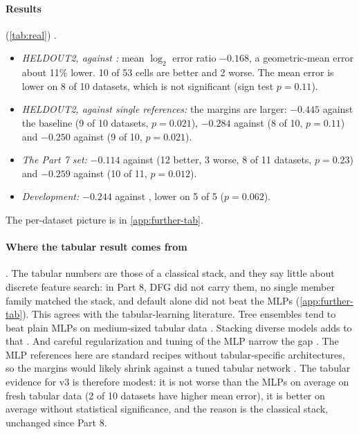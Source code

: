 \paragraph{Results} (\cref{tab:real}) .
\begin{itemize}
\item \emph{HELDOUT2, against :} mean $\log_2$ error ratio $-0.168$, a geometric-mean error about 11\% lower. 10 of 53 cells are better and 2 worse. The mean error is lower on 8 of 10 datasets, which is not significant (sign test $p=0.11$).
\item \emph{HELDOUT2, against single references:} the margins are larger: $-0.445$ against the baseline  (9 of 10 datasets, $p=0.021$), $-0.284$ against  (8 of 10, $p=0.11$) and $-0.250$ against  (9 of 10, $p=0.021$).
\item \emph{The Part 7 set:} $-0.114$ against  (12 better, 3 worse, 8 of 11 datasets, $p=0.23$) and $-0.259$ against  (10 of 11, $p=0.012$).
\item \emph{Development:} $-0.244$ against , lower on 5 of 5 ($p=0.062$).
\end{itemize}
The per-dataset picture is in \cref{app:further-tab}.

\paragraph{Where the tabular result comes from} . The tabular numbers are those of a classical stack, and they say little about discrete feature search: in Part 8, DFG did not carry them, no single member family matched the stack, and default  alone did not beat the MLPs \cite{discretelearners2026} (\cref{app:further-tab}). This agrees with the tabular-learning literature. Tree ensembles tend to beat plain MLPs on medium-sized tabular data \cite{grinsztajn2022tree,shwartzziv2022tabular}. Stacking diverse models adds to that \cite{wolpert1992stacked,erickson2020autogluon}. And careful regularization and tuning of the MLP narrow the gap \cite{kadra2021welltuned,gorishniy2021revisiting}. The MLP references here are standard recipes without tabular-specific architectures, so the margins would likely shrink against a tuned tabular network . The tabular evidence for v3 is therefore modest: it is not worse than the MLPs on average on fresh tabular data (2 of 10 datasets have higher mean error), it is better on average without statistical significance, and the reason is the classical stack, unchanged since Part 8.
